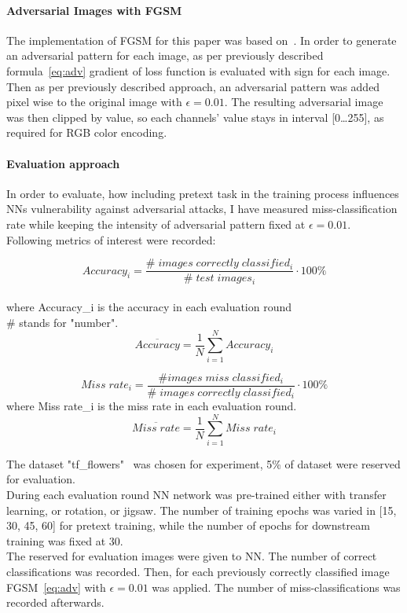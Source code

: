 \paragraph{Adversarial Images with FGSM}
The implementation of FGSM for this paper was based on~\cite{FGSM}.
In order to generate an adversarial pattern for each image, as per previously described formula~\ref{eq:adv}
gradient of loss function is evaluated with sign for each image.
Then as per previously described approach,
an adversarial pattern was added pixel wise to the original image with $\epsilon = 0.01$.
The resulting adversarial image was then clipped by value, so each channels' value stays in interval [0\ldots255],
as required for RGB color encoding.

\paragraph{Evaluation approach}
In order to evaluate, how including pretext task in the training process influences NNs vulnerability against adversarial attacks,
I have measured miss-classification rate while keeping the intensity of adversarial pattern fixed at $\epsilon = 0.01$.
\\
Following metrics of interest were recorded:

\begin{equation}
    Accuracy_i = \frac{\# \; images \; correctly \; classified_i}{\# \; test \; images_i} \cdot 100 \%
\end{equation} \\
where Accuracy\_i is the accuracy in each evaluation round \\
\# stands for "number".
\begin{equation}
    \overline{Accuracy} = \frac{1}{N}  \sum_{i=1}^{N}{Accuracy_i}
\end{equation}


\begin{equation}
    Miss \; rate_i = \frac{\# images \; miss \; classified_i}{\# \; images \; correctly \; classified_i} \cdot 100 \%
\end{equation}
where Miss rate\_i is the miss rate in each evaluation round.
\begin{equation}
    \overline{Miss \; rate} = \frac{1}{N}  \sum_{i=1}^{N}{Miss \; rate_i}
\end{equation}


The dataset "tf\_flowers"~\cite{tfflowers} was chosen for experiment, 5\% of dataset were reserved for evaluation.
\\
During each evaluation round NN network was pre-trained either with transfer learning, or rotation, or jigsaw.
The number of training epochs was varied in [15, 30, 45, 60] for pretext training, while the number of epochs for downstream
training was fixed at 30.
\\
The reserved for evaluation images were given to NN. The number of correct classifications was recorded.
Then, for each previously correctly classified image FGSM~\ref{eq:adv} with $\epsilon = 0.01$ was applied.
The number of miss-classifications was recorded afterwards.
